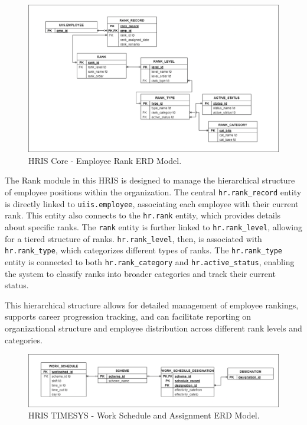     \begin{figure}[H]
        \centering
        \includegraphics[width=1\linewidth]{figures/images/diagrams/erd/erd-core-rank.png}
        \caption{HRIS Core - Employee Rank ERD Model.}
        \label{fig:erd-core-rank}
    \end{figure}

    The Rank module in this HRIS is designed to manage the hierarchical structure of employee positions within the organization. The central \texttt{hr.rank\_record} entity is directly linked to \texttt{uiis.employee}, associating each employee with their current rank. This entity also connects to the \texttt{hr.rank} entity, which provides details about specific ranks. The \texttt{rank} entity is further linked to \texttt{hr.rank\_level}, allowing for a tiered structure of ranks. \texttt{hr.rank\_level}, then, is associated with \texttt{hr.rank\_type}, which categorizes different types of ranks. The \texttt{hr.rank\_type} entity is connected to both \texttt{hr.rank\_category} and \texttt{hr.active\_status}, enabling the system to classify ranks into broader categories and track their current status. 
            
    This hierarchical structure allows for detailed management of employee rankings, supports career progression tracking, and can facilitate reporting on organizational structure and employee distribution across different rank levels and categories.
    
    \begin{figure}[H]
        \centering
        \includegraphics[width=1\linewidth]{figures/images/diagrams/erd/erd-timesys-work-schedule-scheme-and-assignment.png}
        \caption{HRIS TIMESYS - Work Schedule and Assignment ERD Model.}
        \label{fig:erd-timesys-work-schedule-scheme-and-assignment}
    \end{figure}

